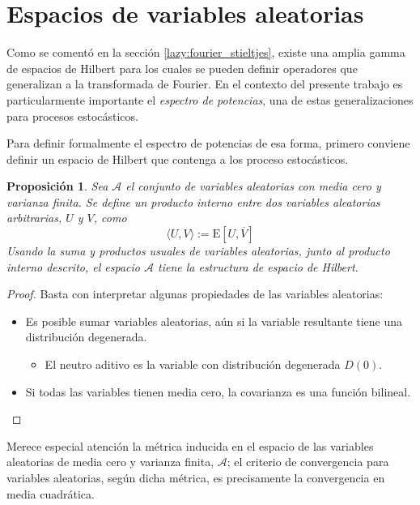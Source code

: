 \documentclass[12pt,letterpaper]{book}
\newtheorem{proposicion}[teorema]{Proposición}
\newcommand{\E}[1]{\mathrm{E}\left[ #1 \right]}
\begin{document}

\section{Espacios de variables aleatorias}

Como se comentó en la sección \ref{lazy:fourier_stieltjes}, existe una amplia gamma de espacios de Hilbert para los cuales se pueden definir operadores que generalizan a la transformada de Fourier.
%
En el contexto del presente trabajo es particularmente importante el \textit{espectro de potencias}, una de estas generalizaciones para procesos estocásticos.

Para definir formalmente el espectro de potencias de esa forma, primero conviene definir un espacio de Hilbert que contenga a los proceso estocásticos.

\begin{proposicion}
Sea $\mathcal{A}$ el conjunto de variables aleatorias con media cero y varianza finita. Se define un producto interno entre dos variables aleatorias arbitrarias, $U$ y $V$, como
\begin{equation}
\langle U , V \rangle := \E{U, \overline{V}}
\end{equation}
Usando la suma y productos usuales de variables aleatorias, junto al producto interno descrito, el espacio $\mathcal{A}$ tiene la estructura de espacio de Hilbert.
\end{proposicion}

\begin{proof}
Basta con interpretar algunas propiedades de las variables aleatorias:
\begin{itemize}
\item Es posible sumar variables aleatorias, aún si la variable resultante tiene una distribución degenerada.
\begin{itemize}
\item El neutro aditivo es la variable con distribución degenerada $D(0)$.
\end{itemize}
\item Si todas las variables tienen media cero, la covarianza es una función bilineal.
\end{itemize}
\end{proof}

Merece especial atención la métrica inducida en el espacio de las variables aleatorias de media cero y varianza finita, $\mathcal{A}$; el criterio de convergencia para variables aleatorias, según dicha métrica, es precisamente la convergencia en media cuadrática.
\end{document}
